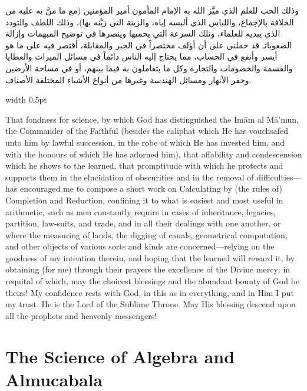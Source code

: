 \documentclass[10pt,a4paper]{book}
\newlength{\colwidth}
\newcommand{\bilingualpair}[2]{%
  \noindent
  \begin{minipage}[t]{\colwidth}
  \begin{flushright}
  \vspace{0pt}
  {\arabicfont\small #1}
  \end{flushright}
  \end{minipage}%
  \hfill\textcolor{columnsepclr}{\vrule width 0.5pt}\hfill
  \begin{minipage}[t]{\colwidth}
  \vspace{0pt}
  {\small #2}
  \end{minipage}%
  \par\vspace{0.6em}
}
\begin{document}
\bilingualpair{
وذلك الحب للعلم الذي ميَّز الله به الإمام المأمون أمير المؤمنين
(مع ما منَّ به عليه من الخلافة بالإجماع، واللباس الذي ألبسه
إياه، والزينة التي زيَّنه بها)، وذلك اللطف والتودد الذي يبديه
للعلماء، وتلك السرعة التي يحميها وينصرها في توضيح المبهمات
وإزالة الصعوباتـ قد حملني على أن أؤلف مختصراً في الجبر
والمقابلة، أقتصر فيه على ما هو أيسر وأنفع في الحساب، مما
يحتاج إليه الناس دائماً في مسائل الميراث والعطايا والقسمة
والخصومات والتجارة وكل ما يتعاملون به فيما بينهم، أو في
مساحة الأرضين وحفر الأنهار ومسائل الهندسة وغيرها من
أنواع الأشياء المختلفة الأصناف.
}{
That fondness for science, by which God has distinguished the Im\=am al
M\=a'mun, the Commander of the Faithful (besides the caliphat which He has
vouchsafed unto him by lawful succession, in the robe of which He has invested
him, and with the honours of which He has adorned him), that affability and
condescension which he shows to the learned, that promptitude with which he
protects and supports them in the elucidation of obscurities and in the
removal of difficulties---has encouraged me to compose a short work on
Calculating by (the rules of) Completion and Reduction, confining it to what
is easiest and most useful in arithmetic, such as men constantly require in
cases of inheritance, legacies, partition, law-suits, and trade, and in all
their dealings with one another, or where the measuring of lands, the digging
of canals, geometrical computation, and other objects of various sorts and
kinds are concerned---relying on the goodness of my intention therein, and
hoping that the learned will reward it, by obtaining (for me) through their
prayers the excellence of the Divine mercy: in requital of which, may the
choicest blessings and the abundant bounty of God be theirs! My confidence
rests with God, in this as in everything, and in Him I put my trust. He is
the Lord of the Sublime Throne. May His blessing descend upon all the
prophets and heavenly messengers!
}

\newpage


\part{The Science of Algebra and Almucabala}
\label{part:algebra}

\end{document}
